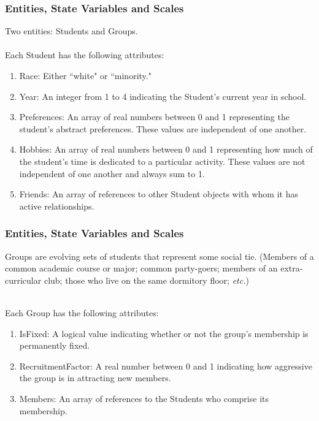 \documentclass{beamer}
\begin{document}
%
%


\begin{frame}
\frametitle{Entities, State Variables and Scales}
Two entities: Students and Groups.\\

~~\\

Each Student has the following attributes:
\begin{enumerate}
\item Race: Either ``white" or ``minority."
\item Year: An integer from 1 to 4 indicating the Student's current year in school.
\item Preferences: An array of real numbers between 0 and 1 representing the student's abstract preferences. These values are independent of one another.
\item Hobbies: An array of real numbers between 0 and 1 representing how much of the student's time is dedicated to a particular activity. These values are not independent of one another and always sum to 1.
\item Friends: An array of references to other Student objects with whom it has active relationships.
\end{enumerate}
\end{frame}


\begin{frame}
\frametitle{Entities, State Variables and Scales}
Groups are evolving sets of students that represent some social tie. (Members
of a common academic course or major; common party-goers; members of an
extra-curricular club; those who live on the same
dormitory floor; \textit{etc.}) 

~~\\
Each Group has the following attributes:
\begin{enumerate}
\item IsFixed: A logical value indicating whether or not the group's membership is permanently fixed.
\item RecruitmentFactor: A real number between 0 and 1 indicating how aggressive the group is in attracting new members.
\item Members: An array of references to the Students who comprise its membership.
\end{enumerate}
\end{frame}
\end{document}
